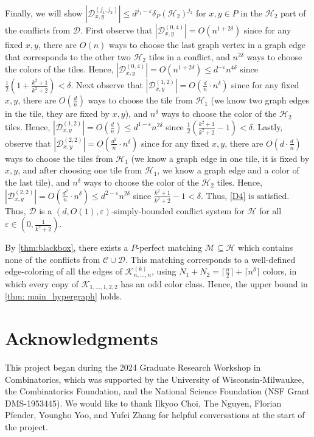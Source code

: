 \documentclass{article}
\theoremstyle{definition}
\newcommand\cH{{\mathcal H}}
\newcommand\cC{{\mathcal C}}
\newcommand{\cD}{\mathcal{D}}
\newcommand\cM{{\mathcal M}}
\newcommand\cK{{\mathcal K}}
\begin{document}
    Finally, we will show $\left|\cD_{x,y}^{(j_1,j_2)}\right| \leq d^{j_1 - \varepsilon} \delta_P(\cH_2)^{j_2}$ for $x,y \in P$ in the $\cH_2$ part of the conflicts from $\cD$.  First observe that $\left|\cD_{x,y}^{(0,4)}\right| = O(n^{1+2\delta})$ since for any fixed $x,y$, there are $O(n)$ ways to choose the last graph vertex in a graph edge that corresponds to the other two $\cH_2$ tiles in a conflict, and $n^{2\delta}$ ways to choose the colors of the tiles.  Hence, $\left|\cD_{x,y}^{(0,4)}\right| = O(n^{1+2\delta}) \leq d^{-\varepsilon} n^{4\delta}$ since $\frac{1}{2} (1 + \frac{k^2+1}{k^2+2}) < \delta$.  Next observe that $\left|\cD_{x,y}^{(1,2)}\right| = O\left( \frac{d}{n} \cdot n^{\delta}\right)$ since for any fixed $x,y$, there are $O\left(\frac{d}{n}\right)$ ways to choose the tile from $\cH_1$ (we know two graph edges in the tile, they are fixed by $x,y$), and $n^{\delta}$ ways to choose the color of the $\cH_2$ tiles.  Hence, $\left|\cD_{x,y}^{(1,2)}\right| = O\left(\frac{d}{n}\right) \leq d^{1-\varepsilon} n^{2\delta}$ since $\frac{1}{2} \left( \frac{k^2+1}{k^2+2} - 1 \right) < \delta$.  Lastly, observe that $\left|\cD_{x,y}^{(2,2)}\right| = O\left( \frac{d^2}{n}  \cdot n^{\delta}\right)$ since for any fixed $x,y$, there are $O\left(d \cdot \frac{d}{n}\right)$ ways to choose the tiles from $\cH_1$ (we know a graph edge in one tile, it is fixed by $x,y$, and after choosing one tile from $\cH_1$, we know a graph edge and a color of the last tile), and $n^{\delta}$ ways to choose the color of the $\cH_2$ tiles.  Hence, $\left|\cD_{x,y}^{(2,2)}\right| = O\left(\frac{d^2}{n} \cdot n^\delta \right) \leq d^{2-\varepsilon} n^{2\delta}$ since $\frac{k^2+1}{k^2+2} - 1 < \delta$.  Thus, \ref{D4} is satisfied.  Thus, $\cD$ is a $(d,O(1),\varepsilon)$-simply-bounded conflict system for $\cH$ for all $\varepsilon \in \left(0,\frac{1}{k^2 + 2} \right)$.

    By \cref{thm:blackbox}, there exists a $P$-perfect matching $\cM \subseteq \cH$ which contains none of the conflicts from $\cC \cup \cD$.  This matching corresponds to a well-defined edge-coloring of all the edges of $\cK^{(k)}_{n,\dots,n}$, using $N_1+N_2=\lceil\frac{n}{2}\rceil + \lceil n^\delta\rceil$ colors, in which every copy of $\cK_{1,\dots,1,2,2}$ has an odd color class.  Hence, the upper bound in \cref{thm: main_hypergraph} holds. 


\section{Acknowledgments}
This project began during the 2024 Graduate Research Workshop in Combinatorics, which was supported by the University of Wisconsin-Milwaukee, the Combinatorics Foundation, and the National Science Foundation (NSF Grant DMS-1953445). 
We would like to thank Ilkyoo Choi, The Nguyen, Florian Pfender, Youngho Yoo, and Yufei Zhang for helpful conversations at the start of the project. 





\end{document}

